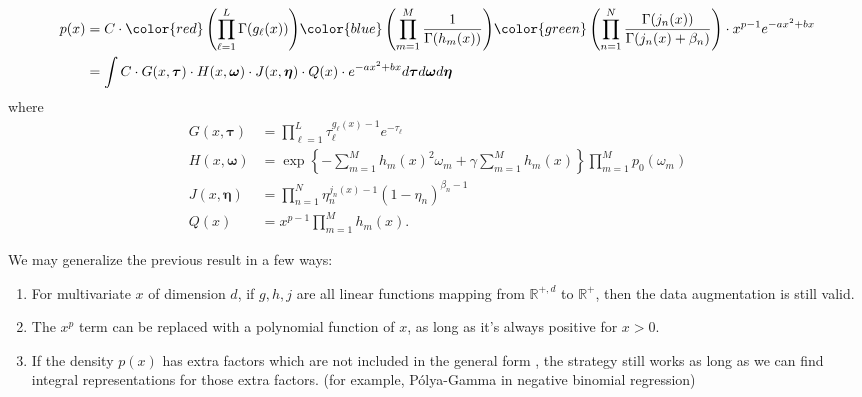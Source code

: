 \documentclass[10pt]{beamer}
\theoremstyle{remark}
\theoremstyle{definition}
\begin{document}
\begin{frame}
\footnotesize
\begin{align*}
p(x)  &= C \cdot{\color{red}\left(\prod_{\ell=1}^L \Gamma(g_\ell(x)) \right)}{\color{blue} \left(\prod_{m=1}^M \frac{1}{\Gamma(h_m(x))}\right)}{\color{green} \left(\prod_{n=1}^N\frac{\Gamma(j_n(x))}{\Gamma(j_n(x) + \beta_n)}\right)} \cdot x^{p-1} e^{-ax^2 + bx}\\
&=\int C\cdot  G(x, \bm{\tau})\cdot H(x, \bm{\omega}) \cdot J(x, \bm{\eta}) \cdot Q(x) \cdot e^{-ax^2 + bx} d\bm{\tau}d\bm{\omega}d\bm{\eta} 
\end{align*}
where 
\begin{align*}
G(x, \bm{\tau}) &= \prod_{\ell=1}^L \tau_{\ell}^{g_{\ell}(x)-1} e^{-\tau_\ell} \\
H(x, \bm{\omega}) &= \exp\left\{-\sum_{m=1}^M h_m(x)^2 \omega_m + \gamma\sum_{m=1}^M h_m(x)\right\} \prod_{m=1}^M p_0(\omega_m) \\
J(x, \bm{\eta}) &= \prod_{n=1}^N \eta_n^{j_n(x)-1} (1-\eta_n)^{\beta_n-1}\\
Q(x) &= x^{p-1} \prod_{m=1}^M h_m(x).
\end{align*}
\end{frame}

\begin{frame}
	We may generalize the previous result in a few ways:
	\vspace{0.1in}
	\begin{enumerate}
		\item For multivariate $x$ of dimension $d$, if $g,h,j$ are all linear functions mapping from $\mathbb{R}^{+, d}$ to $\mathbb{R}^+$, then the data augmentation is still valid.
		\item The $x^p$ term can be replaced with a polynomial function of $x$, as long as it's always positive for $x > 0$.
		\item If the density $p(x)$ has extra factors which are not included in the general form , the strategy still works as long as we can find integral representations for those extra factors. (for example, P\'olya-Gamma in negative binomial regression)
	\end{enumerate} 
\end{frame}
\end{document}
